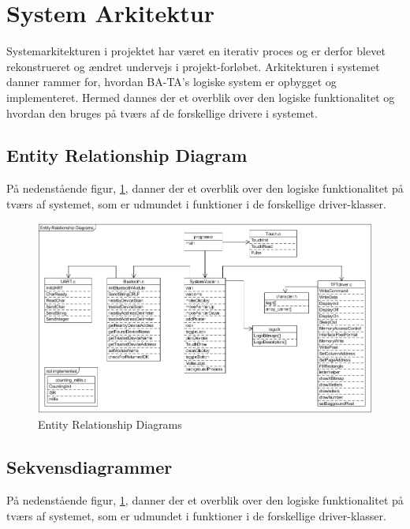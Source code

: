 \graphicspath{{Chapters/SystemArkitektur/}}

\section{System Arkitektur}

Systemarkitekturen i projektet har været en iterativ proces og er derfor blevet rekonstrueret og ændret undervejs i projekt-forløbet.
Arkitekturen i systemet danner rammer for, hvordan BA-TA's logiske system er opbygget og implementeret. Hermed dannes der et overblik over den logiske funktionalitet og hvordan den bruges på tværs af de forskellige drivere i systemet.

\subsection{Entity Relationship Diagram}
På nedenstående figur, \ref{fig:Entity}, danner der et overblik over den logiske funktionalitet på tværs af systemet, som er udmundet i funktioner i de forskellige driver-klasser.

\begin{figure}[H]
	\centering
	\includegraphics[width = 300 pt]{Img/Entity.png}
	\caption{Entity Relationship Diagrams}
	\label{fig:Entity}
\end{figure}

\subsection{Sekvensdiagrammer}
På nedenstående figur, \ref{fig:Entity}, danner der et overblik over den logiske funktionalitet på tværs af systemet, som er udmundet i funktioner i de forskellige driver-klasser.

